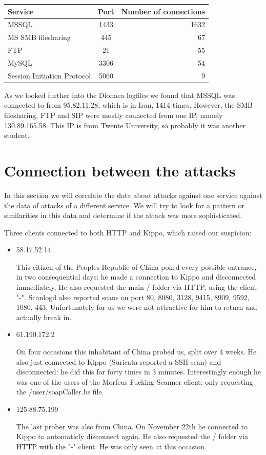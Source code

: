\documentclass[11pt]{article}
\begin{document}
\begin{tabular}{|l|c|r|}
\hline
Service & Port & Number of connections \\ \hline
MSSQL  & 1433 & 1632 \\ \hline
MS SMB filesharing & 445 & 67 \\ \hline
FTP & 21 & 55 \\ \hline
MySQL & 3306 & 54 \\ \hline
Session Initiation Protocol & 5060 & 9 \\ \hline
\end{tabular}

As we looked further into the Dionaea logfiles we found that MSSQL was connected to from 95.82.11.28, which is in Iran, 1414 times. However, the SMB filesharing, FTP and SIP were mostly connected from one IP, namely 130.89.165.58. This IP is from Twente University, so probably it was another student.




\section{Connection between the attacks}
\label{Connection}
In this section we will correlate the data about attacks against one service against the data of attacks of a different service. We will try to look for a pattern or similarities in this data and determine if the attack was more sophisticated.

Three clients connected to both HTTP and Kippo, which raised our suspicion:
\begin{itemize}
\item 58.17.52.14

This citizen of the Peoples Republic of China poked every possible entrance, in two consequential days: he made a connection to Kippo and disconnected immediately. He also requested the main / folder via HTTP, using the client "-". Scanlogd also reported scans on port 80, 8080, 3128, 9415, 8909, 9592, 1080, 443. Unfortunately for us we were not attractive for him to return and actually break in.

\item 61.190.172.2

On four occasions this inhabitant of China probed us, split over 4 weeks. He also just connected to Kippo (Suricata reported a SSH-scan) and disconnected: he did this for forty times in 3 minutes. Interestingly enough he was one of the users of the Morfeus Fucking Scanner client: only requesting the /user/soapCaller.bs file.

\item 125.88.75.199

The last prober was also from China. On November 22th he connected to Kippo to automaticly disconnect again. He also requested the / folder via HTTP with the "-" client. He was only seen at this occasion.

\end{itemize}
\end{document}
